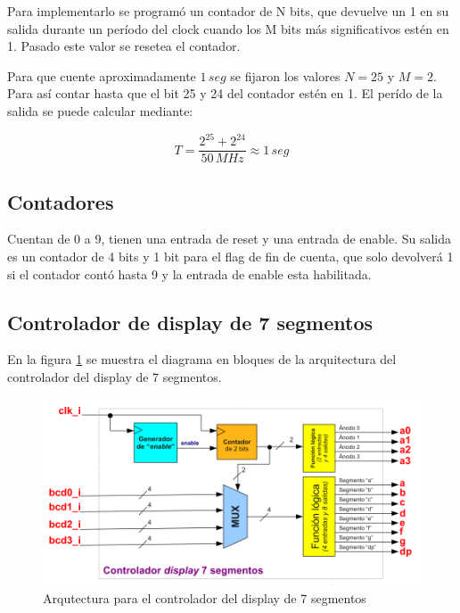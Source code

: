 \documentclass[10pt,spanish,a4paper,openany,notitlepage]{article}
\begin{document}
Para implementarlo se programó un contador de N bits, que devuelve un
1 en su salida durante un período del clock cuando los M bits más 
significativos estén en 1. Pasado este valor se resetea el contador.

Para que cuente aproximadamente $1\, \unit{seg}$ se fijaron los valores
$N = 25$ y $M = 2$. Para así contar hasta que el bit 25 y 24 del contador
estén en 1. El perído de la salida se puede calcular mediante:

\[ \displaystyle T = \frac{2^{25} + 2^{24}}{50\, \unit{MHz}} \approx 1\, \unit{seg} \]

\subsection{Contadores}

Cuentan de 0 a 9, tienen una entrada de reset y una entrada de enable.
Su salida es un contador de 4 bits y 1 bit para el flag de fin de cuenta, 
que solo devolverá 1 si el contador contó hasta 9 y la entrada de enable esta
habilitada.

\subsection{Controlador de display de 7 segmentos}

En la figura \ref{fig:controlador_display} se muestra el diagrama en bloques
de la arquitectura del controlador del display de 7 segmentos.

\begin{figure}[H] %
\begin{center}
\includegraphics[scale=0.4]{./imagenes/controlador_display.png}
\caption{Arqutectura para el controlador del display de 7 segmentos}
 \label{fig:controlador_display}
\end{center}
\end{figure}
\end{document}

